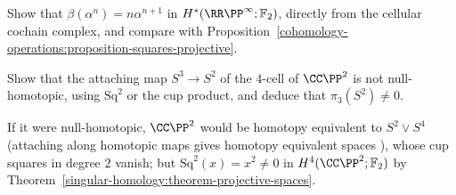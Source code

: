 \begin{exercise}\label{cohomology-operations:exercise-bockstein-rp}
Show that $\beta(\alpha^n) = n\alpha^{n+1}$ in $H^*(\RR\PP^\infty; \mathbb{F}_2)$, directly from the cellular cochain complex, and compare with
Proposition~\ref{cohomology-operations:proposition-squares-projective}.
\end{exercise}

\begin{exercise}\label{cohomology-operations:exercise-cp2-attaching}
Show that the attaching map $S^3 \to S^2$ of the $4$-cell of $\CC\PP^2$ is not null-homotopic, using $\mathrm{Sq}^2$ or the cup product, and deduce that $\pi_3(S^2) \neq 0$.
\end{exercise}

\begin{solution}
If it were null-homotopic, $\CC\PP^2$ would be homotopy equivalent to $S^2 \vee S^4$ (attaching along homotopic maps gives homotopy equivalent spaces \cite[Proposition 0.18]{hatcher-at}),
whose cup squares in degree $2$ vanish; but $\mathrm{Sq}^2(x) = x^2 \neq 0$ in $H^4(\CC\PP^2; \mathbb{F}_2)$ by Theorem~\ref{singular-homology:theorem-projective-spaces}.
\end{solution}
